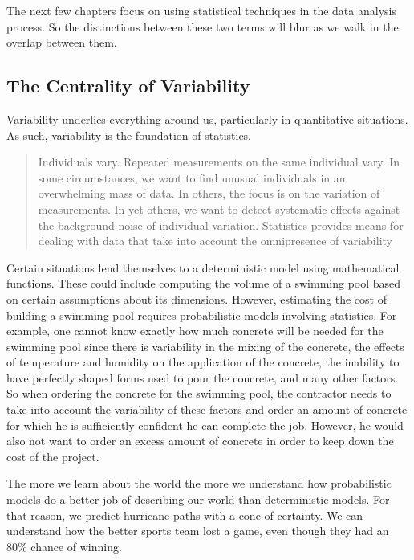 \documentclass[
]{book}
\theoremstyle{definition}
\theoremstyle{definition}
\theoremstyle{definition}
\theoremstyle{definition}
\theoremstyle{remark}
\begin{document}
The next few chapters focus on using statistical techniques in the data analysis process. So the distinctions between these two terms will blur as we walk in the overlap between them.

\hypertarget{the-centrality-of-variability}{%
\subsection{The Centrality of Variability}\label{the-centrality-of-variability}}

Variability underlies everything around us, particularly in quantitative situations. As such, variability is the foundation of statistics.

\begin{quote}
Individuals vary. Repeated measurements on the same individual vary. In some circumstances, we want to find unusual individuals in an overwhelming mass of data. In others, the focus is on the variation of measurements. In yet others, we want to detect systematic effects against the background noise of individual variation. Statistics provides means for dealing with data that take into account the omnipresence of variability \citep[p.~801]{Cobb1997}
\end{quote}

Certain situations lend themselves to a deterministic model using mathematical functions. These could include computing the volume of a swimming pool based on certain assumptions about its dimensions. However, estimating the cost of building a swimming pool requires probabilistic models involving statistics. For example, one cannot know exactly how much concrete will be needed for the swimming pool since there is variability in the mixing of the concrete, the effects of temperature and humidity on the application of the concrete, the inability to have perfectly shaped forms used to pour the concrete, and many other factors. So when ordering the concrete for the swimming pool, the contractor needs to take into account the variability of these factors and order an amount of concrete for which he is sufficiently confident he can complete the job. However, he would also not want to order an excess amount of concrete in order to keep down the cost of the project.

The more we learn about the world the more we understand how probabilistic models do a better job of describing our world than deterministic models. For that reason, we predict hurricane paths with a cone of certainty. We can understand how the better sports team lost a game, even though they had an 80\% chance of winning.
\end{document}
